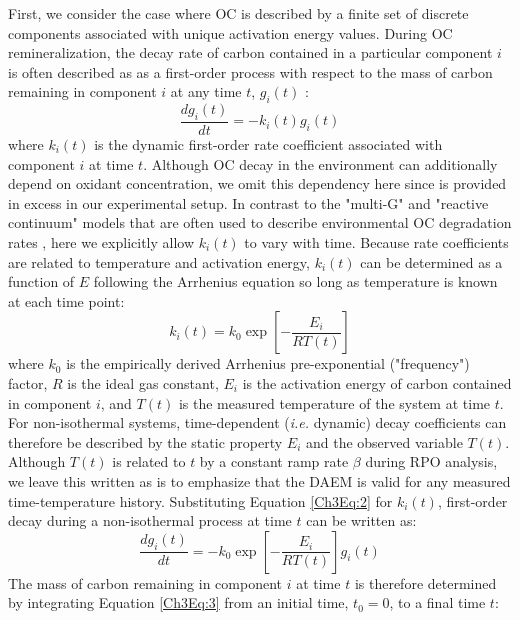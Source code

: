 First, we consider the case where OC is described by a finite set of discrete components associated with unique activation energy values. During OC remineralization, the decay rate of carbon contained in a particular component $i$ is often described as as a first-order process with respect to the mass of carbon remaining in component $i$ at any time $t$, $g_{i}(t)$ \citep{Berner:1980ux,Braun:1987vf}:
%
\begin{equation}\label{Ch3Eq:1}
	\frac{dg_{i}(t)}{dt} = - k_{i}(t) g_{i}(t)
\end{equation}
%
where $k_{i}(t)$ is the dynamic first-order rate coefficient associated with component $i$ at time $t$. Although OC decay in the environment can additionally depend on oxidant concentration, we omit this dependency here since  is provided in excess in our experimental setup. In contrast to the "multi-G" and "reactive continuum" models that are often used to describe environmental OC degradation rates \citep{Westrich:1984uj,Boudreau:1991wf,Forney:2012dr,Forney:2012hz}, here we explicitly allow $k_{i}(t)$ to vary with time. Because rate coefficients are related to temperature and activation energy, $k_{i}(t)$ can be determined as a function of $E$ following the Arrhenius equation so long as temperature is known at each time point:
%
\begin{equation}\label{Ch3Eq:2}
	k_{i}(t) = k_{0} \exp \left[ - \frac{E_{i}}{RT(t)} \right]
\end{equation}
%
where $k_0$ is the empirically derived Arrhenius pre-exponential ("frequency") factor, $R$ is the ideal gas constant, $E_{i}$ is the activation energy of carbon contained in component $i$, and $T(t)$ is the measured temperature of the system at time $t$. For non-isothermal systems, time-dependent (\textit{i.e.} dynamic) decay coefficients can therefore be described by the static property $E_{i}$ and the observed variable $T(t)$. Although $T(t)$ is related to $t$ by a constant ramp rate $\beta$ during RPO analysis, we leave this written as is to emphasize that the DAEM is valid for any measured time-temperature history. Substituting Equation \ref{Ch3Eq:2} for $k_{i}(t)$, first-order decay during a non-isothermal process at time $t$ can be written as:
%
\begin{equation}\label{Ch3Eq:3}
	\frac{dg_{i}(t)}{dt} = - k_{0} \exp \left[ - \frac{E_{i}}{RT(t)} \right] g_{i}(t)
\end{equation}
%
The mass of carbon remaining in component $i$ at time $t$ is therefore determined by integrating Equation \ref{Ch3Eq:3} from an initial time, $t_{0} = 0$, to a final time $t$:
